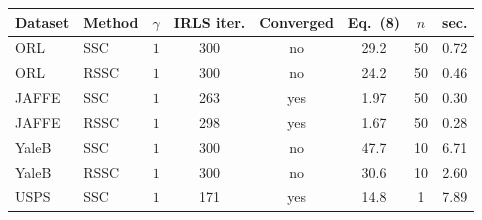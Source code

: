 \begin{tabular}{llcccccc}
\toprule
Dataset & Method & $\gamma$ & IRLS iter. & Converged & Eq.~(8) & $n$ & sec. \\
\midrule
ORL & SSC & $1$ & 300 & no & 29.2 & 50 & 0.72 \\
ORL & RSSC & $1$ & 300 & no & 24.2 & 50 & 0.46 \\
JAFFE & SSC & $1$ & 263 & yes & 1.97 & 50 & 0.30 \\
JAFFE & RSSC & $1$ & 298 & yes & 1.67 & 50 & 0.28 \\
YaleB & SSC & $1$ & 300 & no & 47.7 & 10 & 6.71 \\
YaleB & RSSC & $1$ & 300 & no & 30.6 & 10 & 2.60 \\
USPS & SSC & $1$ & 171 & yes & 14.8 & 1 & 7.89 \\
\bottomrule
\end{tabular}
